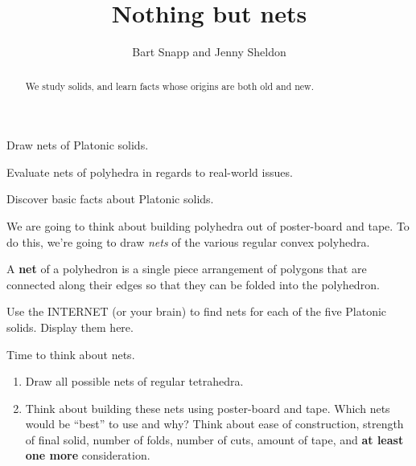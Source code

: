\documentclass[noauthor,nooutcomes,hints,handout]{ximera}
\title{Nothing but nets}
\author{Bart Snapp and Jenny Sheldon}
\begin{document}
\begin{abstract}
  We study solids, and learn facts whose origins are both old and new.
\end{abstract}
\maketitle

\begin{listOutcomes}
\item Draw nets of Platonic solids.
\item Evaluate nets of polyhedra in regards to real-world issues.
\item Discover basic facts about Platonic solids.
\end{listOutcomes}



We are going to think about building polyhedra out
of poster-board and tape. To do this, we're going to draw
\textit{nets} of the various regular convex polyhedra.

\begin{definition}
  A \textbf{net} of a polyhedron is a
  single piece arrangement of polygons that are connected along their
  edges so that they can be folded into the polyhedron.
\end{definition}


\mynewpage


\begin{question}
  Use the INTERNET (or your brain) to find nets for each of the five
  Platonic solids. Display them here.
  
\end{question}
\mynewpage

\begin{question}
  Time to think about nets.
  \begin{enumerate}
  \item Draw all possible nets of regular tetrahedra.
  \item Think about building these nets using poster-board and
    tape. Which nets would be ``best'' to use and why? Think about
    ease of construction, strength of final solid, number of folds,
    number of cuts, amount of tape, and \textbf{at least one more}
    consideration.
  \end{enumerate}
\end{question}
\mynewpage
\end{document}
